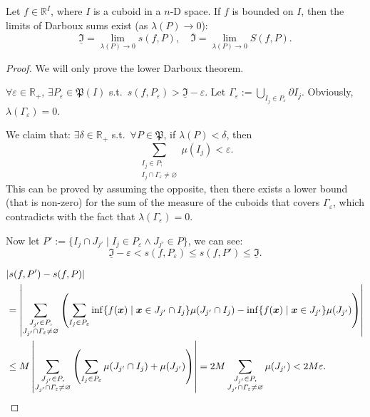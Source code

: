 \documentclass[openany]{book}
\begin{document}
\begin{theorem}
	\label{theorem: Darboux}
	Let $f \in \mathbb R^I$, where $I$ is a cuboid in a $n$-D space.
	If $f$ is bounded on $I$, then the limits of Darboux sums exist (as $\lambda(P) \to 0$):
	\begin{equation*}
		\underline{\mathfrak I} = \lim_{\lambda(P) \to 0} s(f, P),
		\quad
		\overline{\mathfrak I} = \lim_{\lambda(P) \to 0} S(f, P).
	\end{equation*}
\end{theorem}
\begin{proof}
	We will only prove the lower Darboux theorem.

	$\forall \varepsilon \in \mathbb R_+$, $\exists P_\varepsilon \in \mathfrak P(I)$ s.t.\ $s(f, P_\varepsilon) > \underline{\mathfrak I} - \varepsilon$.
	Let $\varGamma_\varepsilon := \bigcup_{I_j \in P_\varepsilon} \partial I_j$.
	Obviously, $\lambda(\varGamma_\varepsilon) = 0$.

	We claim that: $\exists \delta \in \mathbb R_+$ s.t.\ $\forall P \in \mathfrak P$, if $\lambda(P) < \delta$, then
	\begin{equation*}
		\sum_{\substack{I_j \in P;\\ I_j \cap \varGamma_\varepsilon \neq \varnothing}} \mu(I_j) < \varepsilon.
	\end{equation*}
	This can be proved by assuming the opposite, then there exists a lower bound (that is non-zero) for the sum of the measure of the cuboids that covers $\varGamma_\varepsilon$, which contradicts with the fact that $\lambda(\varGamma_\varepsilon) = 0$.

	Now let $P' := \{I_j \cap J_{j'} \mid I_j \in P_\varepsilon \wedge J_{j'} \in P\}$, we can see:
	\begin{equation*}
		\underline{\mathfrak I} - \varepsilon < s(f, P_\varepsilon) \leq s(f, P') \leq \underline{\mathfrak I}.
	\end{equation*}

	\begin{align*}
		&|s(f, P') - s(f, P)| 
		\\
		&= \left|
			\sum_{\substack{J_{j'} \in P,\\ J_{j'} \cap \varGamma_\varepsilon \neq \varnothing}}
				\left(
					\sum_{I_j \in P_\varepsilon} \inf\{f(\boldsymbol{x})\mid \boldsymbol{x} \in J_{j'} \cap I_j\} \mu(J_{j'} \cap I_j)
					-
					\inf\{f(\boldsymbol{x})\mid \boldsymbol{x} \in J_{j'}\} \mu(J_{j'})
				\right)
		\right|
		\\
		&\leq M \left|
		\sum_{\substack{J_{j'} \in P,\\ J_{j'} \cap \varGamma_\varepsilon \neq \varnothing}}
			\left(
				\sum_{I_j \in P_\varepsilon} \mu(J_{j'} \cap I_j)
				+ \mu(J_{j'})
			\right)
		\right|
		= 2M \sum_{\substack{J_{j'} \in P,\\ J_{j'} \cap \varGamma_\varepsilon \neq \varnothing}}\mu(J_{j'}) < 2M \varepsilon.
	\end{align*}


\end{proof}
\end{document}
